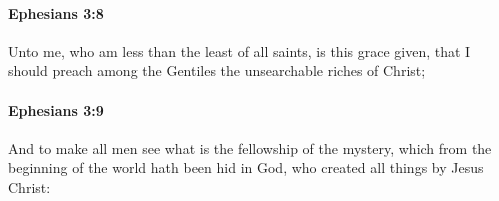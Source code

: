 		\paragraph{Ephesians 3:8} %
			\label{EPHESIANS-3-8}

			Unto me, who am less than the least of all saints, is this grace given, that I should preach among the Gentiles the unsearchable riches of Christ;

			\begin{framed}
			\scriptsize
				\begin{compactdesc}
					\item[SBLG] 
				\end{compactdesc}
			\end{framed}

		\paragraph{Ephesians 3:9} %
			\label{EPHESIANS-3-9}

			And to make all men see what is the fellowship of the mystery, which from the beginning of the world hath been hid in God, who created all things by Jesus Christ:

